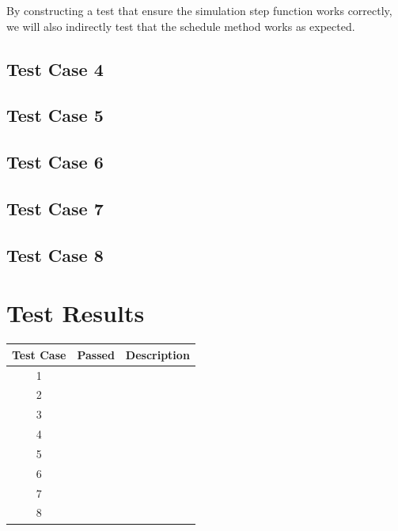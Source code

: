 \documentclass[11pt]{article}
\newcommand{\cmark}{\ding{51}}%
\newcommand{\xmark}{\ding{55}}
\begin{document}
By constructing a test that ensure the simulation step function works correctly, we will also indirectly test that the schedule method works as expected.


\subsection{Test Case 4}
\subsection{Test Case 5}
\subsection{Test Case 6}
\subsection{Test Case 7}
\subsection{Test Case 8}

\section{Test Results}%

\begin{center}
\begin{tabular}{|c|c|r|}
	\hline
	\textbf{Test Case} & \textbf{Passed} & \textbf{Description} \\
	\hline
	1 & \textcolor{pass_grn}{\cmark} &\\
	\hline
	2 & \textcolor{fail_red}{\xmark} &\\
	\hline
	3 & \textcolor{pass_grn}{\cmark} &\\
	\hline
	4 & \textcolor{pass_grn}{\cmark} &\\
	\hline
	5 & \textcolor{pass_grn}{\cmark} &\\
	\hline
	6 & \textcolor{pass_grn}{\cmark} &\\
	\hline
	7 & \textcolor{pass_grn}{\cmark} &\\
	\hline
	8 & \textcolor{pass_grn}{\cmark} &\\
	\hline
\end{tabular}
\end{center}
\end{document}
